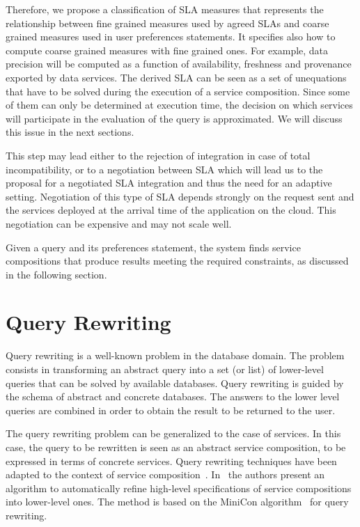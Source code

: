 Therefore, we propose a classification of SLA measures that represents the relationship between fine grained measures used by agreed SLAs and coarse grained measures used in user preferences statements. It specifies also how to compute coarse grained measures with fine grained ones. For example, data precision will be computed as a function of availability, freshness and provenance exported by data services. The derived SLA  can be seen as a set of unequations that have to be solved during the execution of a service composition. Since some of them can only be determined at execution time, the decision on which services will participate in the evaluation of the query is approximated. We will discuss this issue in the next sections.


This step may lead either to the rejection of integration in case of total incompatibility, or to a negotiation between SLA which will lead us to the proposal for a negotiated SLA integration and thus the need for an adaptive setting.
 Negotiation of this type of SLA depends strongly on the request sent and the services deployed at the arrival time of the application on the cloud. This negotiation can be expensive and may not scale well.
 
 Given a query and its preferences statement, the system  finds  service compositions that produce results   meeting the required constraints, as discussed in the following section.
 
\section{Query Rewriting}
\label{sec:queryRew}

Query rewriting is a well-known problem in the database domain.
The problem consists in transforming an abstract query into a set (or list) of lower-level queries that can be solved by  available databases.
Query rewriting is guided by the schema of  abstract and concrete databases.
The answers to the lower level queries are combined in order to obtain the result to be returned to the user.

The query rewriting problem can be generalized to the case of services.
In this case, the query to be rewritten is seen as an abstract service composition, to be expressed in terms of concrete services.
Query rewriting techniques have been adapted to the context of service composition~\cite{BBM10,ZLC11,CostaAMR13}. 
In~\cite{CostaAMR13} the authors present an algorithm to automatically refine high-level specifications of service compositions into lower-level ones. 
The method is based on the MiniCon algorithm~\cite{PH01} for query rewriting.

